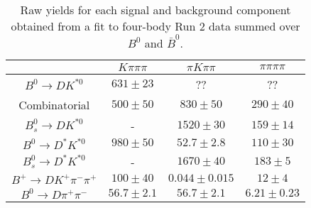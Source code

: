 \begin{table}
  \centering
  \begin{tabular}{cccc}
      \toprule
       & $K\pi\pi\pi$ & $\pi K\pi\pi$ & $\pi\pi\pi\pi$ \\
      \midrule
      $B^0 \to DK^{*0}$ & $631 \pm 23$ & ?? & ?? \\
      Combinatorial & $500 \pm 50$ & $830 \pm 50$ & $290 \pm 40$ \\
      $B^0_s \to DK^{*0}$ & \-- & $1520 \pm 30$ & $159 \pm 14$ \\
      $B^0 \to D^*K^{*0}$ & $980 \pm 50$ & $52.7 \pm 2.8$ & $110 \pm 30$ \\
      $B^0_s \to D^*K^{*0}$ & \-- & $1670 \pm 40$ & $183 \pm 5$ \\
      $B^+ \to DK^+\pi^-\pi^+$ & $100 \pm 40$ & $0.044 \pm 0.015$ & $12 \pm 4$ \\
      $B^0 \to D\pi^+\pi^-$ & $56.7 \pm 2.1$ & $56.7 \pm 2.1$ & $6.21 \pm 0.23$ \\
      \bottomrule
      \end{tabular}
  \caption{Raw yields for each signal and background component obtained from a fit to four-body Run 2 data summed over $B^0$ and $\bar{B}^0$.}
\label{tab:yields_combined_4body_run2}
\end{table}
